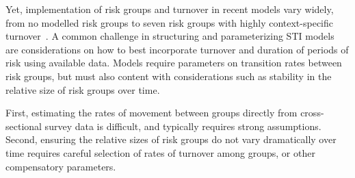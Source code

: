 Yet, implementation of risk groups and turnover in recent models vary widely,
from no modelled risk groups to
seven risk groups with highly context-specific turnover~\citep{Boily2015}.
A common challenge in structuring and parameterizing STI models
are considerations on how to best incorporate
turnover and duration of periods of risk
using available data.
Models require parameters on transition rates between risk groups,
but must also content with considerations such as
stability in the relative size of risk groups over time.
\par
First, estimating the rates of movement between groups
directly from cross-sectional survey data is difficult,
and typically requires strong assumptions.
Second, ensuring the relative sizes of risk groups
do not vary dramatically over time requires
careful selection of rates of turnover among groups,
or other compensatory parameters.
\par
\par


